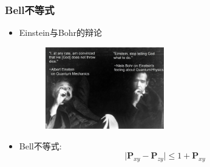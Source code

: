\begin{frame}
	\frametitle{\textrm{Bell}不等式}
	\begin{itemize}
		\item \textrm{Einstein}与\textrm{Bohr}的辩论
            \begin{figure}
        \centering
                \includegraphics[height=1.4in, width=2.1in, viewport=0 0 2119 1460,clip]{Figures/Einstein-and-Bohr-debate.jpg}
		\label{Fig:Einstein-Bohr}
            \end{figure}
    \item \textrm{Bell}不等式:~{\fontsize{8.5pt}{5.2pt}}
	\begin{displaymath}
		\big|\mathbf{P}_{xy}-\mathbf{P}_{zy}\big|\leqslant 1+\mathbf{P}_{xy}
	\end{displaymath}
	{\fontsize{8.5pt}{5.2pt}\selectfont{\textcolor{magenta}{在定域性和实在性的双重假设下，对于两个分离的粒子同时被测量时，其结果的可能的关联程度给出严格的限制}}}
	\end{itemize}
\end{frame}

